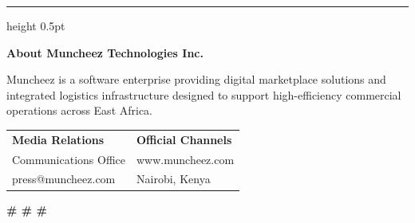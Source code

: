 \documentclass[11pt,a4paper]{article}
\begin{document}
\vspace{0.8cm}

\hrule height 0.5pt
\vspace{0.6cm}

{\textsf{\small\bfseries\color{SolidBlack} About Muncheez Technologies Inc.}}

\textsf{\small\color{SolidBlack} Muncheez is a software enterprise providing digital marketplace solutions and integrated logistics infrastructure designed to support high-efficiency commercial operations across East Africa.}

\vspace{0.6cm}

\begin{tabularx}{\textwidth}{@{} X >{\raggedleft\arraybackslash}X @{}}
    \textsf{\small\bfseries\color{SolidBlack} Media Relations} & \textsf{\small\bfseries\color{SolidBlack} Official Channels} \\
    \textsf{\small\color{SolidBlack} Communications Office} & \textsf{\small\color{LinkBlue} www.muncheez.com} \\
    \textsf{\small\color{LinkBlue} press@muncheez.com} & \textsf{\small\color{SolidBlack} Nairobi, Kenya} \\
\end{tabularx}

\vspace{1.0cm}

\begin{center}
    \textsf{\small\bfseries\color{SolidBlack} \# \# \#}
\end{center}
\end{document}
